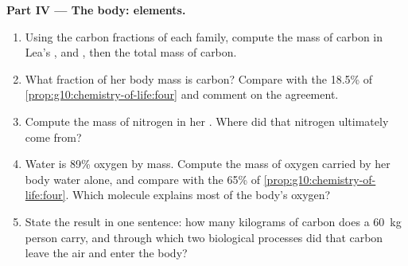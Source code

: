 \begin{problem}
\medskip
\noindent\textbf{Part IV --- The body: elements.}
\begin{enumerate}[resume]
  \item Using the carbon fractions of each family, compute the mass of
        carbon in Lea's ,  and , then the
        total mass of carbon.
  \item What fraction of her body mass is carbon? Compare with the
        18.5\% of \cref{prop:g10:chemistry-of-life:four} and comment
        on the agreement.
  \item Compute the mass of nitrogen in her . Where did that
        nitrogen ultimately come from?
  \item Water is 89\% oxygen by mass. Compute the mass of oxygen
        carried by her body water alone, and compare with the 65\% of
        \cref{prop:g10:chemistry-of-life:four}. Which molecule explains
        most of the body's oxygen?
  \item State the result in one sentence: how many kilograms of carbon
        does a \qty{60}{kg} person carry, and through which two
        biological processes did that carbon leave the air and enter
        the body?
\end{enumerate}
\end{problem}
